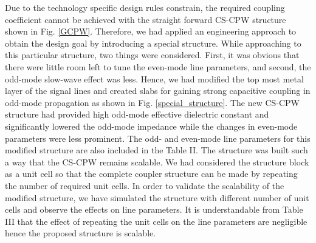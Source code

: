 \documentclass[journal]{IEEEtran}
\begin{document}
Due to the technology specific design rules constrain, the required coupling coefficient cannot be achieved with the straight forward CS-CPW structure shown in Fig. \ref{GCPW}. Therefore, we had applied an engineering approach to obtain the design goal by introducing a special structure. While approaching to this particular structure, two things were considered. First, it was obvious that there were little room left to tune the even-mode line parameters, and second, the odd-mode slow-wave effect was less. Hence, we had modified the top most metal layer of the signal lines and created slabs for gaining strong capacitive coupling in odd-mode propagation as shown in Fig. \ref{special_structure}. The new CS-CPW structure had provided high odd-mode effective dielectric constant and significantly lowered the odd-mode impedance while the changes in even-mode parameters were less prominent. The odd- and even-mode line parameters for this modified structure are also included in the Table II. The structure was built such a way that the CS-CPW remains scalable. We had considered the structure block as a unit cell so that the complete coupler structure can be made by repeating the number of
required unit cells. In order to validate the scalability of the modified structure, we have simulated the structure with different number of unit cells and observe the effects on line parameters. It is understandable from Table III that the effect of repeating the unit cells on the line parameters are negligible hence the proposed structure is scalable.
\end{document}
